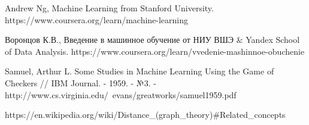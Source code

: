 \begin{thebibliography}{00}
	
	 Andrew Ng, Machine Learning from Stanford University. https://www.coursera.org/learn/machine-learning
	
	 Воронцов К.В., Введение в машинное обучение от НИУ ВШЭ \& Yandex School of Data Analysis. https://www.coursera.org/learn/vvedenie-mashinnoe-obuchenie
	
	 Samuel, Arthur L. Some Studies in Machine Learning Using the Game of Checkers // IBM Journal. - 1959. - №3. - http://www.cs.virginia.edu/~evans/greatworks/samuel1959.pdf
	
	 https://en.wikipedia.org/wiki/Distance\_(graph\_theory)\#Related\_concepts
\end{thebibliography}
